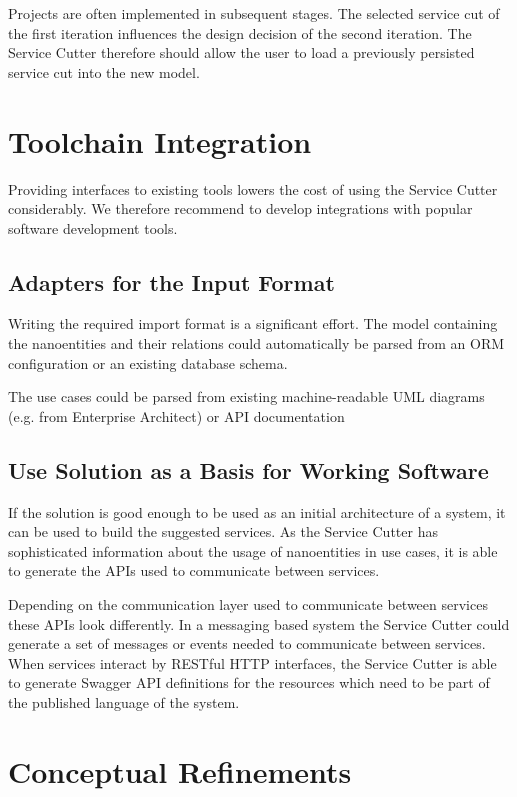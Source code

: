 Projects are often implemented in subsequent stages. The selected service cut of the first iteration influences the design decision of the second iteration. The Service Cutter therefore should allow the user to load a previously persisted service cut into the new model.

\section{Toolchain Integration}

Providing interfaces to existing tools lowers the cost of using the Service Cutter considerably. We therefore recommend to develop integrations with popular software development tools.

\subsection{Adapters for the Input Format}

Writing the required import format is a significant effort. The model containing the nanoentities and their relations could automatically be parsed from an \gls{ORM} configuration or an existing database schema.

The use cases could be parsed from existing machine-readable \gls{UML} diagrams (e.g. from Enterprise Architect\cite{entArch}) or \gls{API} documentation 

\subsection{Use Solution as a Basis for Working Software}

If the solution is good enough to be used as an initial architecture of a system, it can be used to build the suggested services. As the Service Cutter has sophisticated information about the usage of nanoentities in use cases, it is able to generate the APIs used to communicate between services. 

Depending on the communication layer used to communicate between services these APIs look differently. In a messaging based system the Service Cutter could generate a set of messages or events needed to communicate between services. When services interact by RESTful HTTP interfaces, the Service Cutter is able to generate Swagger\cite{swagger} API definitions for the resources which need to be part of the published language\cite[p.375]{evans2003domain} of the system. 

\section{Conceptual Refinements}

